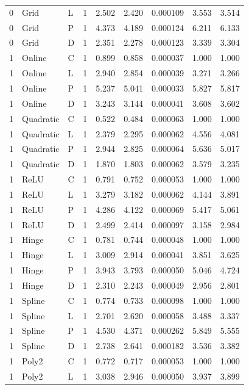 \begin{longtable}{lllrrrrrr}
0 & Grid & L & 1 & 2.502 & 2.420 & 0.000109 & 3.553 & 3.514 \\
0 & Grid & P & 1 & 4.373 & 4.189 & 0.000124 & 6.211 & 6.133 \\
0 & Grid & D & 1 & 2.351 & 2.278 & 0.000123 & 3.339 & 3.304 \\
1 & Online & C & 1 & 0.899 & 0.858 & 0.000037 & 1.000 & 1.000 \\
1 & Online & L & 1 & 2.940 & 2.854 & 0.000039 & 3.271 & 3.266 \\
1 & Online & P & 1 & 5.237 & 5.041 & 0.000033 & 5.827 & 5.817 \\
1 & Online & D & 1 & 3.243 & 3.144 & 0.000041 & 3.608 & 3.602 \\
1 & Quadratic & C & 1 & 0.522 & 0.484 & 0.000063 & 1.000 & 1.000 \\
1 & Quadratic & L & 1 & 2.379 & 2.295 & 0.000062 & 4.556 & 4.081 \\
1 & Quadratic & P & 1 & 2.944 & 2.825 & 0.000064 & 5.636 & 5.017 \\
1 & Quadratic & D & 1 & 1.870 & 1.803 & 0.000062 & 3.579 & 3.235 \\
1 & ReLU & C & 1 & 0.791 & 0.752 & 0.000053 & 1.000 & 1.000 \\
1 & ReLU & L & 1 & 3.279 & 3.182 & 0.000062 & 4.144 & 3.891 \\
1 & ReLU & P & 1 & 4.286 & 4.122 & 0.000069 & 5.417 & 5.061 \\
1 & ReLU & D & 1 & 2.499 & 2.414 & 0.000097 & 3.158 & 2.984 \\
1 & Hinge & C & 1 & 0.781 & 0.744 & 0.000048 & 1.000 & 1.000 \\
1 & Hinge & L & 1 & 3.009 & 2.914 & 0.000041 & 3.851 & 3.625 \\
1 & Hinge & P & 1 & 3.943 & 3.793 & 0.000050 & 5.046 & 4.724 \\
1 & Hinge & D & 1 & 2.310 & 2.243 & 0.000049 & 2.956 & 2.801 \\
1 & Spline & C & 1 & 0.774 & 0.733 & 0.000098 & 1.000 & 1.000 \\
1 & Spline & L & 1 & 2.701 & 2.620 & 0.000058 & 3.488 & 3.337 \\
1 & Spline & P & 1 & 4.530 & 4.371 & 0.000262 & 5.849 & 5.555 \\
1 & Spline & D & 1 & 2.738 & 2.641 & 0.000182 & 3.536 & 3.382 \\
1 & Poly2 & C & 1 & 0.772 & 0.717 & 0.000053 & 1.000 & 1.000 \\
1 & Poly2 & L & 1 & 3.038 & 2.946 & 0.000050 & 3.937 & 3.899 \\

\end{longtable}
